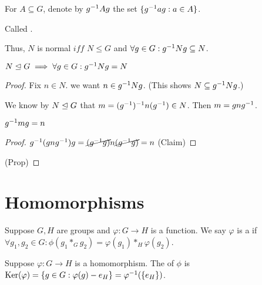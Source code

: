 \documentclass[notes.tex]{subfiles}
\begin{document}
\begin{defn}
	For $A\subseteq G$, denote by ${g}^{-1}Ag$ the set $\{{g}^{-1}ag : a\in A\}$.

	Called .
\end{defn}

\begin{remark}
	Thus, $N$ is normal $iff$ $N\le G$ and $\forall g\in G: {g}^{-1}Ng \subseteq N$.
\end{remark}

\begin{proposition}
	$N\trianglelefteq G \implies \forall g\in G: {g}^{-1}Ng=N$
\end{proposition}
\begin{proof}
	Fix $n\in N$. we want $n\in {g}^{-1}Ng$. (This shows $N\subseteq{g}^{-1}Ng$.)

	We know by $N\trianglelefteq G$ that $m =({g}^{-1})^{-1}n({g}^{-1})\in N$.
	Then $m=gn{g}^{-1}$.
	\begin{claim}
		${g}^{-1}mg=n$
	\end{claim}
	\begin{proof}
		${g}^{-1}(gn{g}^{-1})g=\cancel{({g}^{-1}g)}n\cancel{({g}^{-1}g)} = n$
		\qedhere(Claim)
	\end{proof}
	\qedhere(Prop)
\end{proof}


\chapter*{Homomorphisms}
\begin{defn}
	Suppose $G, H$ are groups and $\varphi:G\to H$ is a function. 
	We say $\varphi$ is a  if $\forall g_1, g_2\in G: \phi(g_1 *_G g_2) = \varphi(g_1) *_H \varphi(g_2)$.
\end{defn}

\begin{defn}
	Suppose $\varphi:G\to H$ is a homomorphism. The  of $\phi$ is $\operatorname{\mathrm{Ker}}(\varphi) = \{g\in G : \varphi(g) - e_H\} = \varphi^{-1}(\{e_H\})$.
\end{defn}
\end{document}
